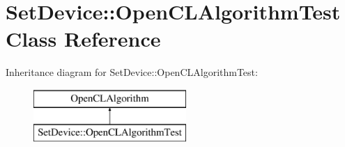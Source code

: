 \hypertarget{class_set_device_1_1_open_c_l_algorithm_test}{\section{Set\-Device\-:\-:Open\-C\-L\-Algorithm\-Test Class Reference}
\label{class_set_device_1_1_open_c_l_algorithm_test}
}
Inheritance diagram for Set\-Device\-:\-:Open\-C\-L\-Algorithm\-Test\-:\begin{figure}[H]
\begin{center}
\leavevmode
\includegraphics[height=2.000000cm]{class_set_device_1_1_open_c_l_algorithm_test}
\end{center}
\end{figure}
